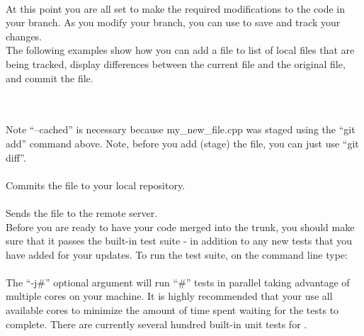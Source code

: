 \begin{itemize}
 \\

  At this point you are all set to make the required modifications to the 
  code in your branch.  As you modify your branch, you can use {\GIT} to
  save and track your changes. \\

  The following examples show how you can add a file to list of local
  files that are being tracked, display differences between the current
  file and the original file, and commit the file.  

 \\
 \\

  Note ``--cached'' is necessary because my\_new\_file.cpp was staged using
  the ``git add'' command above.  Note, before you add (stage) the
  file, you can just use ``git diff''. \\

 \\

  Commits the file to your local repository. \\

 \\

  Sends the file to the remote server. \\

  Before you are ready to have your code merged into the {\nek}
  trunk, you should make sure that it passes the built-in test suite -
  in addition to any new tests that you have added for your
  updates. To run the test suite, on the command line type: \\
  
 \\
  
  The ``-j\#'' optional argument will run ``\#'' tests in parallel
  taking advantage of multiple cores on your machine.  It is highly
  recommended that your use all available cores to minimize the amount
  of time spent waiting for the tests to complete. There are currently
  several hundred built-in unit tests for {\nek}. \\


\end{itemize}
